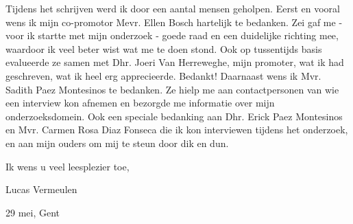 Tijdens het schrijven werd ik door een aantal mensen geholpen. Eerst en vooral wens ik mijn co-promotor Mevr. Ellen Bosch hartelijk te bedanken. Zei gaf me - voor ik startte met mijn onderzoek - goede raad en een duidelijke richting mee, waardoor ik veel beter wist wat me te doen stond. Ook op tussentijds basis evalueerde ze samen met Dhr. Joeri Van Herreweghe, mijn promoter, wat ik had geschreven, wat ik heel erg apprecieerde. Bedankt! Daarnaast wens ik Mvr. Sadith Paez Montesinos te bedanken. Ze hielp me aan contactpersonen van wie een interview kon afnemen en bezorgde me informatie over mijn onderzoeksdomein. Ook een speciale bedanking aan Dhr. Erick Paez Montesinos en Mvr. Carmen Rosa Diaz Fonseca die ik kon interviewen tijdens het onderzoek, en aan mijn ouders om mij te steun door dik en dun.

Ik wens u veel leesplezier toe,

Lucas Vermeulen

29 mei, Gent